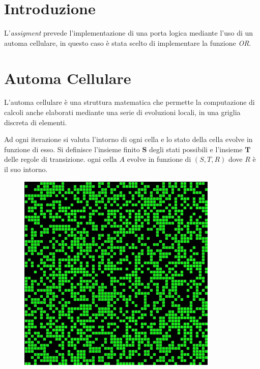 \documentclass[12pt]{article}
\begin{document}
\maketitle
\newpage

\section{Introduzione}
L'\emph{assigment} prevede l'implementazione di una porta logica mediante l'uso di un automa cellulare, in questo caso è stata scelto di implementare la funzione \emph{OR}.

\section{Automa Cellulare}
L'automa cellulare è una struttura matematica che permette la computazione di calcoli anche elaborati mediante una serie di evoluzioni locali, in una griglia discreta di elementi.

Ad ogni iterazione si valuta l'intorno di ogni cella e lo stato della cella evolve in funzione di esso. 
Si definisce l'insieme finito $\mathbf{S}$ degli stati possibili e l'insieme $\mathbf{T}$ delle regole di transizione. ogni cella $A$ evolve in funzione di $(S,T,R) $ dove $R$ è il suo intorno.

\begin{figure}[h]
\includegraphics{Cellular_Automata.jpg}
\centering
\end{figure}
\end{document}
